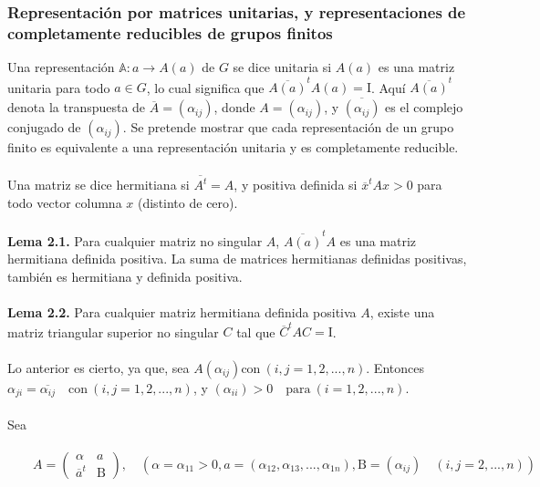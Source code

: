\documentclass[12pt]{book}
\theoremstyle{definition}
\newcounter{in}
\newcounter{ini}
\begin{document}
\subsubsection{Representación por matrices unitarias, y representaciones de completamente reducibles de grupos finitos}
Una representación $\mathbb{A}: a \rightarrow A\left(a\right)$ de $G$  se dice unitaria si $A\left(a\right)$ es una matriz unitaria para todo $a \in G$, lo cual significa que $\overline{A\left(a\right)}^{t}A\left(a\right)=\mathrm{I}$. Aquí $\overline{A\left(a\right)}^{t}$ denota la transpuesta de $\overline{A}=\left(\alpha_{ij}\right)$, donde $A=\left(\alpha_{ij}\right)$, y $\overline{\left(\alpha_{ij}\right)}$ es el complejo conjugado de $\left(\alpha_{ij}\right)$. Se pretende mostrar que cada representación de un grupo finito es equivalente a una representación unitaria y es completamente reducible.\\~\\
Una matriz se dice hermitiana si $\overline{A^{t}}=A$, y positiva definida si $\overline{x}^{t}Ax>0$ para todo vector columna $x$ (distinto de cero).\\~\\
\textbf{Lema 2.1.} Para cualquier matriz no singular $A$, $\overline{A\left(a\right)}^{t}A$ es una matriz hermitiana definida positiva. La suma de matrices hermitianas definidas positivas, también es hermitiana y definida positiva.\\~\\
\textbf{Lema 2.2.} Para cualquier matriz hermitiana definida positiva $A$, existe una matriz triangular superior no singular $C$ tal que $\overline{C}^{t}AC=\mathrm{I}$.\\~\\
Lo anterior es cierto, ya que, sea $A\left(\alpha_{ij}\right) \mathrm{con\ } \left(i,j=1,2,...,n\right)$. Entonces $\alpha_{ji}=\overline{\alpha_{ij}} \quad \mathrm{con\ } \left(i,j=1,2,...,n\right)$, y $\left(\alpha_{ii}\right)>0 \quad \mathrm{para\ } \left(i=1,2,...,n\right)$.\\~\\
Sea\\~\\
$\qquad 
A=
\begin{pmatrix}
\alpha & a \\ 
\overline{a}^{t} & \mathrm{B}
\end{pmatrix}, \quad \left(\alpha=\alpha_{11}>0,
a=\left(\alpha_{12},\alpha_{13},...,\alpha_{1n}\right),
\mathrm{B}=\left(\alpha_{ij}\right) \quad \left(i,j=2,...,n\right) \right) $\\~\\
\end{document}
